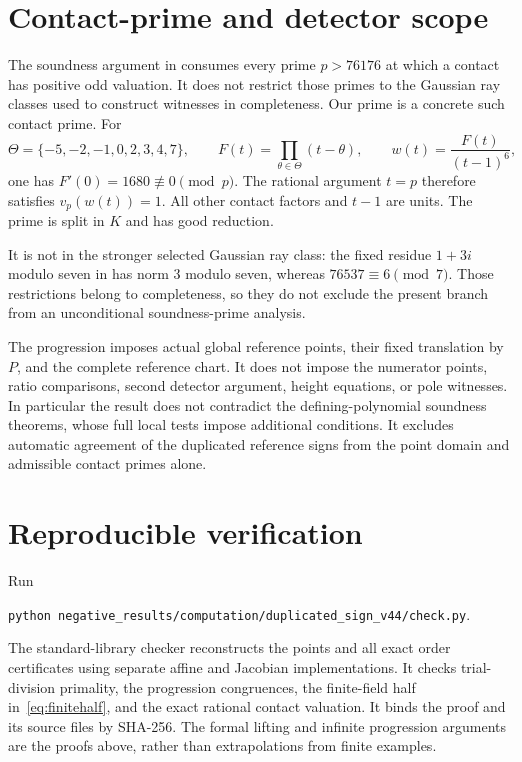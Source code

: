 \documentclass[11pt,a4paper]{article}
\begin{document}
\section{Contact-prime and detector scope}

The soundness argument in \cite{ABC79,ABC78} consumes every prime
$p>76176$ at which a contact has positive odd valuation. It does not
restrict those primes to the Gaussian ray classes used to construct
witnesses in completeness. Our prime is a concrete such contact prime.
For
\[
 \Theta=\{-5,-2,-1,0,2,3,4,7\},\qquad
 F(t)=\prod_{\theta\in\Theta}(t-\theta),\qquad
 w(t)=\frac{F(t)}{(t-1)^6},
\]
one has $F'(0)=1680\not\equiv0\pmod p$. The rational argument
$t=p$ therefore satisfies $v_p(w(t))=1$. All other contact factors
and $t-1$ are units. The prime is split in $K$ and has good reduction.

It is not in the stronger selected Gaussian ray class: the fixed
residue $1+3i$ modulo seven in \cite[Section~2]{Dependencies} has norm
$3$ modulo seven, whereas $76537\equiv6\pmod7$. Those restrictions
belong to completeness, so they do not exclude the present branch
from an unconditional soundness-prime analysis.

The progression imposes actual global reference points, their fixed
translation by $P$, and the complete reference chart. It does not
impose the numerator points, ratio comparisons, second detector argument,
height equations, or pole witnesses. In particular the result does not
contradict the defining-polynomial soundness theorems, whose full local
tests impose additional conditions. It excludes automatic agreement of
the duplicated reference signs from the point domain and admissible
contact primes alone.

\section{Reproducible verification}

Run
\begin{center}\small
\texttt{python negative\_results/computation/duplicated\_sign\_v44/check.py}.
\end{center}
The standard-library checker reconstructs the points and all exact
order certificates using separate affine and Jacobian implementations.
It checks trial-division primality, the progression congruences,
the finite-field half in~\eqref{eq:finitehalf}, and the exact rational
contact valuation. It binds the proof and its source files by SHA-256.
The formal lifting and infinite progression arguments are the proofs
above, rather than extrapolations from finite examples.
\end{document}
